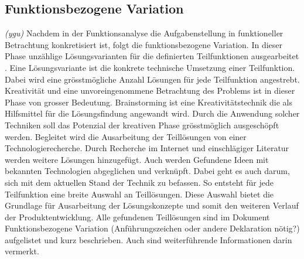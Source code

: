 \subsection{Funktionsbezogene Variation}
\textit{(ygu)} Nachdem in der Funktionsanalyse die Aufgabenstellung in funktioneller Betrachtung konkretisiert ist, folgt die funktionsbezogene Variation. In dieser Phase unzählige Lösungsvarianten für die definierten Teilfunktionen ausgearbeitet \cite{pahl}. Eine Lösungsvariante ist die konkrete technische Umsetzung einer Teilfunktion. Dabei wird eine grösstmögliche Anzahl Lösungen für jede Teilfunktion angestrebt. 
\newline
Kreativität und eine unvoreingenommene Betrachtung des Problems ist in dieser Phase von grosser Bedeutung. Brainstorming ist eine Kreativitätstechnik die als Hilfsmittel für die Lösungsfindung angewandt wird. Durch die Anwendung solcher Techniken soll das Potenzial der kreativen Phase grösstmöglich ausgeschöpft werden.
\newline
Begleitet wird die Ausarbeitung der Teillösungen von einer Technologierecherche. Durch Recherche im Internet und einschlägiger Literatur werden weitere Lösungen hinzugefügt. Auch werden Gefundene Ideen mit bekannten Technologien abgeglichen und verknüpft. Dabei geht es auch darum, sich mit dem aktuellen Stand der Technik zu befassen. 
\newline
So entsteht für jede Teilfunktion eine breite Auswahl an Teillösungen. Diese Auswahl bietet die Grundlage für Ausarbeitung der Lösungskonzepte und somit den weiteren Verlauf der Produktentwicklung. Alle gefundenen Teillösungen sind im Dokument Funktionsbezogene Variation (Anführungszeichen oder andere Deklaration nötig?) aufgelistet und kurz beschrieben. Auch sind weiterführende Informationen darin vermerkt.

